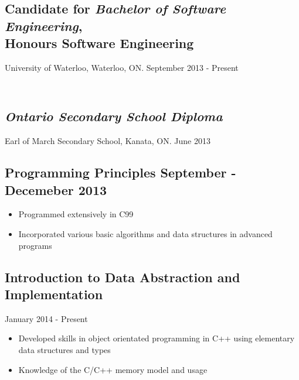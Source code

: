 \documentclass[12pt]{article}
\begin{document}
\begin{minipage}[t]{0.8\linewidth} 
	\subsection*{Candidate for \textit{Bachelor of Software Engineering}, \\ Honours Software Engineering} 								\vspace{-6pt}
		University of Waterloo, Waterloo, ON. \hspace{40pt} September 2013 - Present
	
	\subsection*{\textit{\\Ontario Secondary School Diploma}} \vspace{-6pt}
		Earl of March Secondary School, Kanata, ON. \hspace{80pt} June 2013\vspace{24pt}
		
	\subsection*{Programming Principles \hspace{75pt} \textnormal{September - Decemeber 2013}} \vspace{-6pt}
		\begin{itemize}
			\item Programmed extensively in C99
			\item Incorporated various basic algorithms and data structures in advanced programs
		\end{itemize}
		
	\subsection*{Introduction to Data Abstraction and Implementation}\vspace{-6pt} 
		\noindent \hfill January 2014 - Present
		\begin{itemize}
			\item Developed skills in object orientated programming in C++ using elementary data structures and 							types
			\item Knowledge of the C/C++ memory model and usage
		\end{itemize}
		

\end{minipage}
\end{document}
